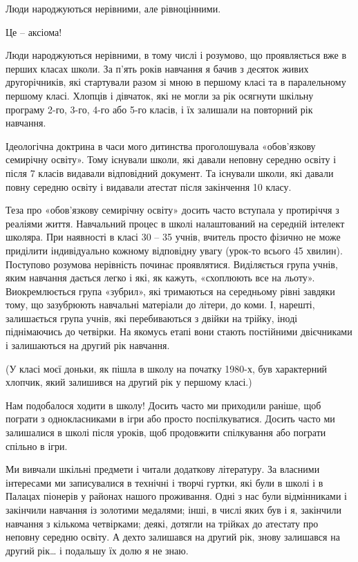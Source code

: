 \begin{itemize}

Люди народжуються нерівними, але рівноцінними.

Це – аксіома!

Люди народжуються нерівними, в тому числі і розумово, що проявляється вже в
перших класах школи. За п’ять років навчання я бачив з десяток живих
другорічників, які стартували разом зі мною в першому класі та в паралельному
першому класі. Хлопців і дівчаток, які не могли за рік осягнути шкільну
програму 2-го, 3-го, 4-го або 5-го класів, і їх залишали на повторний рік
навчання.

Ідеологічна доктрина в часи мого дитинства проголошувала «обов’язкову семирічну
освіту». Тому існували школи, які давали неповну середню освіту і після 7
класів видавали відповідний документ. Та існували школи, які давали повну
середню освіту і видавали атестат після закінчення 10 класу.

Теза про «обов’язкову семирічну освіту» досить часто вступала у протиріччя з
реаліями життя. Навчальний процес в школі налаштований на середній інтелект
школяра. При наявності в класі 30 – 35 учнів, вчитель просто фізично не може
приділити індивідуально кожному відповідну увагу (урок-то всього 45 хвилин).
Поступово розумова нерівність починає проявлятися. Виділяється група учнів,
яким навчання дається легко і які, як кажуть, «схоплюють все на льоту».
Виокремлюється група «зубрил», які тримаються на середньому рівні завдяки тому,
що зазубрюють навчальні матеріали до літери, до коми. І, нарешті, залишається
група учнів, які перебиваються з двійки на трійку, іноді піднімаючись до
четвірки. На якомусь етапі вони стають постійними двієчниками і залишаються на
другий рік навчання.

(У класі моєї доньки, як пішла в школу на початку 1980-х, був характерний
хлопчик, який залишився на другий рік у першому класі.)

Нам подобалося ходити в школу! Досить часто ми приходили раніше, щоб пограти з
однокласниками в ігри або просто поспілкуватися. Досить часто ми залишалися в
школі після уроків, щоб продовжити спілкування або пограти спільно в ігри.

Ми вивчали шкільні предмети і читали додаткову літературу. За власними
інтересами ми записувалися в технічні і творчі гуртки, які були в школі і в
Палацах піонерів у районах нашого проживання. Одні з нас були відмінниками і
закінчили навчання із золотими медалями; інші, в числі яких був і я, закінчили
навчання з кількома четвірками; деякі, дотягли на трійках до атестату про
неповну середню освіту. А дехто залишався на другий рік, знову залишався на
другий рік… і подальшу їх долю я не знаю.


\end{itemize}
